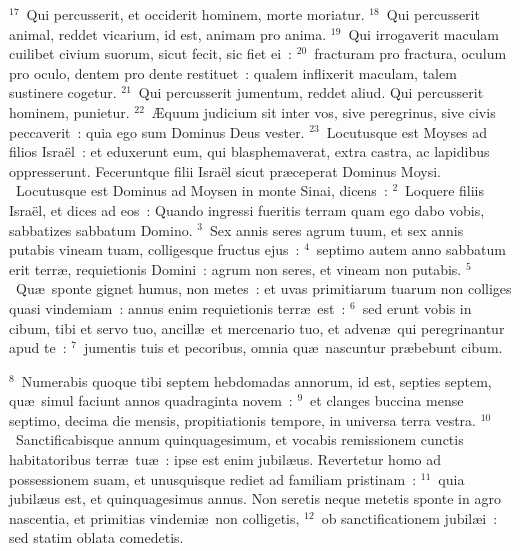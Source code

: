 ${}^{17}$~Qui percusserit, et occiderit hominem, morte moriatur.
${}^{18}$~Qui percusserit animal, reddet vicarium, id est, animam pro anima.
${}^{19}$~Qui irrogaverit maculam cuilibet civium suorum, sicut fecit, sic fiet ei~:
${}^{20}$~fracturam pro fractura, oculum pro oculo, dentem pro dente restituet~: qualem inflixerit maculam, talem sustinere cogetur.
${}^{21}$~Qui percusserit jumentum, reddet aliud. Qui percusserit hominem, punietur.
${}^{22}$~\AE quum judicium sit inter vos, sive peregrinus, sive civis peccaverit~: quia ego sum Dominus Deus vester.
${}^{23}$~Locutusque est Moyses ad filios Isra\"el~: et eduxerunt eum, qui blasphemaverat, extra castra, ac lapidibus oppresserunt. Feceruntque filii Isra\"el sicut pr\ae ceperat Dominus Moysi.
~\lettrine[lines=10,image=true,loversize=0.05,lraise=-0.03]{L}{}ocutusque est Dominus ad Moysen in monte Sinai, dicens~:
${}^{2}$~Loquere filiis Isra\"el, et dices ad eos~: Quando ingressi fueritis terram quam ego dabo vobis, sabbatizes sabbatum Domino.
${}^{3}$~Sex annis seres agrum tuum, et sex annis putabis vineam tuam, colligesque fructus ejus~:
${}^{4}$~septimo autem anno sabbatum erit terr\ae , requietionis Domini~: agrum non seres, et vineam non putabis.
${}^{5}$~Qu\ae\ sponte gignet humus, non metes~: et uvas primitiarum tuarum non colliges quasi vindemiam~: annus enim requietionis terr\ae\ est~:
${}^{6}$~sed erunt vobis in cibum, tibi et servo tuo, ancill\ae\ et mercenario tuo, et adven\ae\ qui peregrinantur apud te~:
${}^{7}$~jumentis tuis et pecoribus, omnia qu\ae\ nascuntur pr\ae bebunt cibum.


${}^{8}$~Numerabis quoque tibi septem hebdomadas annorum, id est, septies septem, qu\ae\ simul faciunt annos quadraginta novem~:
${}^{9}$~et clanges buccina mense septimo, decima die mensis, propitiationis tempore, in universa terra vestra.
${}^{10}$~Sanctificabisque annum quinquagesimum, et vocabis remissionem cunctis habitatoribus terr\ae\ tu\ae~: ipse est enim jubil\ae us. Revertetur homo ad possessionem suam, et unusquisque rediet ad familiam pristinam~:
${}^{11}$~quia jubil\ae us est, et quinquagesimus annus. Non seretis neque metetis sponte in agro nascentia, et primitias vindemi\ae\ non colligetis,
${}^{12}$~ob sanctificationem jubil\ae i~: sed statim oblata comedetis.


